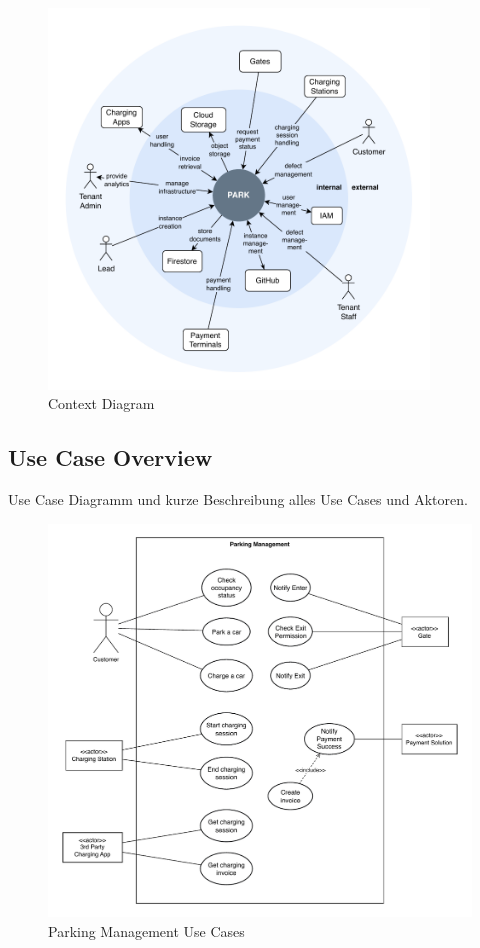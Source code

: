 \begin{figure}[ht]
    \centering
    \includegraphics[width=0.9\textwidth]{resources/context-diagram.pdf}
    \caption{Context Diagram}
    \label{fig:context-diagram}
\end{figure}


\subsection{Use Case Overview}
Use Case Diagramm und kurze Beschreibung alles Use Cases und Aktoren.

\begin{figure}[ht]
    \centering
    \includegraphics[width=\textwidth]{resources/park-ma-use-cases.pdf}
    \caption{Parking Management Use Cases}
    \label{fig:park-ma-use-cases}
\end{figure}

